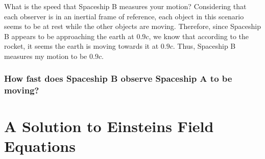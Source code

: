 \documentclass{article}
\begin{document}
What is the speed that Spaceship B measures your motion? Considering that each observer is in an inertial frame of reference, each object in this scenario seems to be at rest while the other objects are moving. Therefore, since Spaceship B appears to be approaching the earth at $0.9c$, we know that according to the rocket, it seems the earth is moving towards it at $0.9c$. Thus, Spaceship B measures my motion to be $0.9c$.

\subsubsection{How fast does Spaceship B observe Spaceship A to be moving?}
	\section{A Solution to Einsteins Field Equations}
\end{document}
